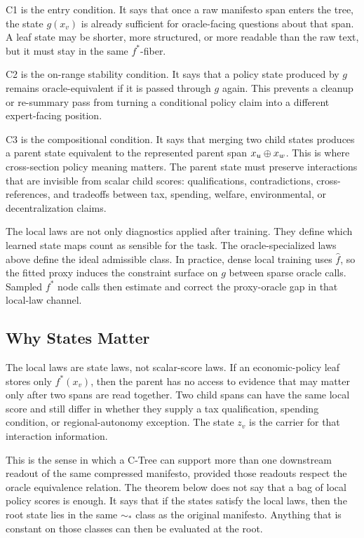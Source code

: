 C1 is the entry condition. It says that once a raw manifesto span enters the
tree, the state \(g(x_v)\) is already sufficient for oracle-facing questions
about that span. A leaf state may be shorter, more structured, or more
readable than the raw text, but it must stay in the same \(f^\ast\)-fiber.

C2 is the on-range stability condition. It says that a policy state produced
by \(g\) remains oracle-equivalent if it is passed through \(g\) again. This
prevents a cleanup or re-summary pass from turning a conditional policy claim
into a different expert-facing position.

C3 is the compositional condition. It says that merging two child states
produces a parent state equivalent to the represented parent span
\(x_u\oplus x_w\). This is where cross-section policy meaning matters. The
parent state must preserve interactions that are invisible from scalar child
scores: qualifications, contradictions, cross-references, and tradeoffs between
tax, spending, welfare, environmental, or decentralization claims.

The local laws are not only diagnostics applied after training. They define
which learned state maps count as sensible for the task. The oracle-specialized
laws above define the ideal admissible class. In practice, dense local training
uses \(\widehat f\), so the fitted proxy induces the constraint surface on
\(g\) between sparse oracle calls. Sampled \(f^\ast\) node calls then estimate
and correct the proxy-oracle gap in that local-law channel.

\subsection{Why States Matter}

The local laws are state laws, not scalar-score laws. If an economic-policy
leaf stores only \(f^\ast(x_v)\), then the parent has no access to evidence
that may matter only after two spans are read together. Two child spans can
have the same local score and still differ in whether they supply a tax
qualification, spending condition, or regional-autonomy exception. The state
\(z_v\) is the carrier for that interaction information.

This is the sense in which a C-Tree can support more than one downstream
readout of the same compressed manifesto, provided those readouts respect the
oracle equivalence relation. The theorem below does not say that a bag of
local policy scores is enough. It says that if the states satisfy the local
laws, then the root state lies in the same \(\sim_\ast\) class as the original
manifesto. Anything that is constant on those classes can then be evaluated at
the root.

